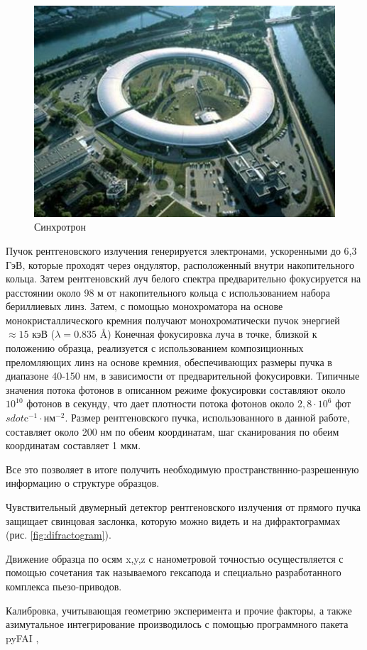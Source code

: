 	\begin{figure}
\singlespacing
\vspace{-5px}
    \includegraphics[width=\linewidth]{fig/pribor-photo.jpg}
    \vspace{3px}
    \caption{Синхротрон}
    \label{fig:ring}
\end{figure}

 Пучок рентгеновского излучения генерируется электронами, ускоренными до 6,3 ГэВ, которые проходят через ондулятор, расположенный внутри накопительного кольца. Затем рентгеновский луч белого спектра предварительно фокусируется на расстоянии около 98 м от накопительного кольца с использованием набора бериллиевых линз. Затем, с помощью монохроматора на основе монокристаллического кремния получают монохроматически пучок энергией $\approx 15$ кэВ ($\lambda = 0.835$ \AA) Конечная фокусировка луча в точке, близкой к положению образца, реализуется с использованием композиционных преломляющих линз на основе кремния, обеспечивающих размеры пучка в диапазоне 40-150 нм, в зависимости от предварительной фокусировки. Типичные значения потока фотонов в описанном режиме фокусировки составляют около $10^10$ фотонов в секунду, что дает плотности потока фотонов около $2,8\cdot 10^6$ фот$sdot$c$^{-1} \cdot$нм$^{-2}$. Размер рентгеновского пучка, использованного в данной работе, составляет около 200 нм по обеим координатам, шаг сканирования по обеим координатам составляет 1 мкм. 
 
 
Все это позволяет в итоге получить необходимую пространствннно-разрешенную информацию о структуре образцов.

 Чувствительный двумерный детектор  рентгеновского излучения от прямого пучка защищает свинцовая заслонка, которую можно видеть и на дифрактограммах (рис. \ref{fig:difractogram}).

Движение образца по осям x,y,z  с нанометровой точностью осуществляется с помощью сочетания так называемого гексапода и специально разработанного комплекса пьезо-приводов.

Калибровка, учитывающая  геометрию эксперимента и прочие факторы, а также азимутальное интегрирование производилось с помощью программного пакета pyFAI \cite{pyfai}, 



